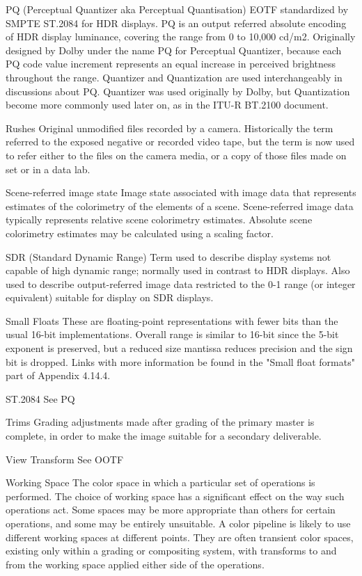 PQ (Perceptual Quantizer aka Perceptual Quantisation)
EOTF standardized by SMPTE ST.2084 for HDR displays. PQ is an output referred absolute encoding of HDR display luminance, covering the range from 0 to 10,000 cd/m2. Originally designed by Dolby under the name PQ for Perceptual Quantizer, because each PQ code value increment represents an equal increase in perceived brightness throughout the range. Quantizer and Quantization are used interchangeably in discussions about PQ. Quantizer was used originally by Dolby, but Quantization become more commonly used later on, as in the ITU-R BT.2100 document.

Rushes
Original unmodified files recorded by a camera. Historically the term referred to the exposed negative or recorded video tape, but the term is now used to refer either to the files on the camera media, or a copy of those files made on set or in a data lab.

Scene-referred image state
Image state associated with image data that represents estimates of the colorimetry of the elements of a scene. Scene-referred image data typically represents relative scene colorimetry estimates. Absolute scene colorimetry estimates may be calculated using a scaling factor.

SDR (Standard Dynamic Range)
Term used to describe display systems not capable of high dynamic range; normally used in contrast to HDR displays. Also used to describe output-referred image data restricted to the 0-1 range (or integer equivalent) suitable for display on SDR displays.

Small Floats
These are floating-point representations with fewer bits than the usual 16-bit implementations. Overall range is similar to 16-bit since the 5-bit exponent is preserved, but a reduced size mantissa reduces precision and the sign bit is dropped. Links with more information be found in the "Small float formats" part of Appendix 4.14.4.

ST.2084
See PQ

Trims
Grading adjustments made after grading of the primary master is complete, in order to make the image suitable for a secondary deliverable.

View Transform
See OOTF

Working Space
The color space in which a particular set of operations is performed. The choice of working space has a significant effect on the way such operations act. Some spaces may be more appropriate than others for certain operations, and some may be entirely unsuitable. A color pipeline is likely to use different working spaces at different points. They are often transient color spaces, existing only within a grading or compositing system, with transforms to and from the working space applied either side of the operations.
